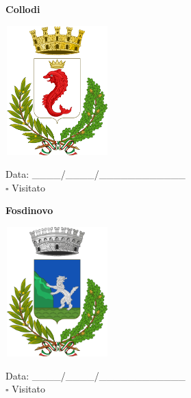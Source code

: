 \documentclass[a5paper,12pt]{article}
\begin{document}
\vspace{0.7cm}

\noindent
\begin{minipage}[t]{0.45\textwidth}
    \begin{center}
        \textbf{Collodi}
    \end{center}
    \vspace{-0.5cm} %
    \begin{center}
        \includegraphics[height= 5cm, width=4cm]{Toscana/Stemma Collodi.png}
    \end{center}
    \vspace{-0.4cm} %
    \begin{flushleft}
        Data: \_\_\_\_/\_\_\_\_/\_\_\_\_\_\_\_\_\_\_\_\_ \\
        $\square$ Visitato
    \end{flushleft}
\end{minipage}
\hfill
\noindent
\begin{minipage}[t]{0.45\textwidth}
    \begin{center}
        \textbf{Fosdinovo}
    \end{center}
    \vspace{-0.5cm} %
    \begin{center}
        \includegraphics[height= 5cm, width=4cm]{Toscana/Stemma Fosdinovo.png}
    \end{center}
    \vspace{-0.4cm} %
    \begin{flushleft}
        Data: \_\_\_\_/\_\_\_\_/\_\_\_\_\_\_\_\_\_\_\_\_ \\
        $\square$ Visitato
    \end{flushleft}
\end{minipage}
\end{document}
